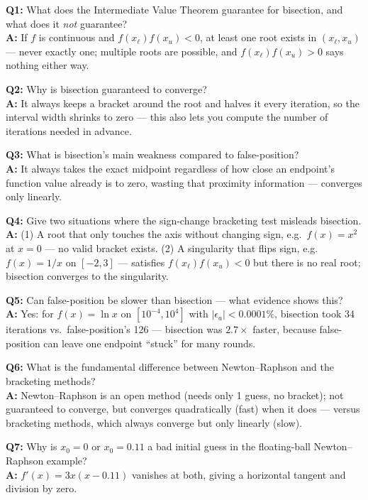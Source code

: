 \begin{qabox}
\textbf{Q1:} What does the Intermediate Value Theorem guarantee for bisection, and what does it \emph{not} guarantee? \\
\textbf{A:} If $f$ is continuous and $f(x_\ell)f(x_u)<0$, at least one root exists in $(x_\ell,x_u)$ — never exactly one; multiple roots are possible, and $f(x_\ell)f(x_u)>0$ says nothing either way.

\textbf{Q2:} Why is bisection guaranteed to converge? \\
\textbf{A:} It always keeps a bracket around the root and halves it every iteration, so the interval width shrinks to zero — this also lets you compute the number of iterations needed in advance.

\textbf{Q3:} What is bisection's main weakness compared to false-position? \\
\textbf{A:} It always takes the exact midpoint regardless of how close an endpoint's function value already is to zero, wasting that proximity information — converges only linearly.

\textbf{Q4:} Give two situations where the sign-change bracketing test misleads bisection. \\
\textbf{A:} (1) A root that only touches the axis without changing sign, e.g.\ $f(x)=x^2$ at $x=0$ — no valid bracket exists. (2) A singularity that flips sign, e.g.\ $f(x)=1/x$ on $[-2,3]$ — satisfies $f(x_\ell)f(x_u)<0$ but there is no real root; bisection converges to the singularity.

\textbf{Q5:} Can false-position be slower than bisection — what evidence shows this? \\
\textbf{A:} Yes: for $f(x)=\ln x$ on $[10^{-4},10^4]$ with $|\epsilon_a|<0.0001\%$, bisection took 34 iterations vs.\ false-position's 126 — bisection was $2.7\times$ faster, because false-position can leave one endpoint ``stuck'' for many rounds.

\textbf{Q6:} What is the fundamental difference between Newton--Raphson and the bracketing methods? \\
\textbf{A:} Newton--Raphson is an open method (needs only 1 guess, no bracket); not guaranteed to converge, but converges quadratically (fast) when it does — versus bracketing methods, which always converge but only linearly (slow).

\textbf{Q7:} Why is $x_0=0$ or $x_0=0.11$ a bad initial guess in the floating-ball Newton--Raphson example? \\
\textbf{A:} $f'(x)=3x(x-0.11)$ vanishes at both, giving a horizontal tangent and division by zero.


\end{qabox}
